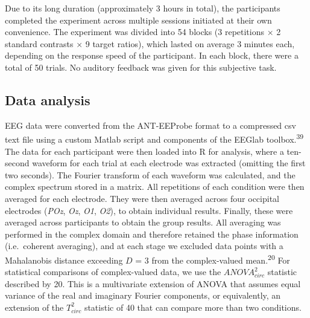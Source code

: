 \documentclass[
]{article}
\begin{document}
Due to its long duration (approximately 3 hours in total), the participants completed the experiment across multiple sessions initiated at their own convenience. The experiment was divided into 54 blocks (3 repetitions \(\times\) 2 standard contrasts \(\times\) 9 target ratios), which lasted on average 3 minutes each, depending on the response speed of the participant. In each block, there were a total of 50 trials. No auditory feedback was given for this subjective task.

\hypertarget{data-analysis}{%
\subsection{Data analysis}\label{data-analysis}}

EEG data were converted from the ANT-EEProbe format to a compressed csv text file using a custom Matlab script and components of the EEGlab toolbox.\textsuperscript{39} The data for each participant were then loaded into R for analysis, where a ten-second waveform for each trial at each electrode was extracted (omitting the first two seconds). The Fourier transform of each waveform was calculated, and the complex spectrum stored in a matrix. All repetitions of each condition were then averaged for each electrode. They were then averaged across four occipital electrodes (\emph{POz}, \emph{Oz}, \emph{O1}, \emph{O2}), to obtain individual results. Finally, these were averaged across participants to obtain the group results. All averaging was performed in the complex domain and therefore retained the phase information (i.e.~coherent averaging), and at each stage we excluded data points with a Mahalanobis distance exceeding \(D\) = 3 from the complex-valued mean.\textsuperscript{20} For statistical comparisons of complex-valued data, we use the \(ANOVA^2_{circ}\) statistic described by 20. This is a multivariate extension of ANOVA that assumes equal variance of the real and imaginary Fourier components, or equivalently, an extension of the \(T^2_{circ}\) statistic of 40 that can compare more than two conditions.
\end{document}
